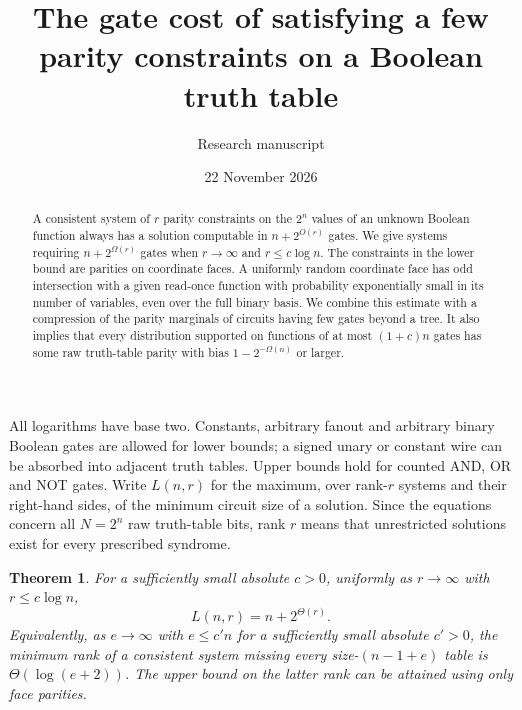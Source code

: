 \documentclass[11pt]{article}
\title{The gate cost of satisfying a few parity constraints on a Boolean truth table}
\author{Research manuscript}\date{22 November 2026}
\newtheorem{theorem}{Theorem}
\begin{document}
\maketitle
\begin{abstract}
A consistent system of $r$ parity constraints on the $2^n$ values of an unknown Boolean function always has a solution computable in $n+2^{O(r)}$ gates. We give systems requiring $n+2^{\Omega(r)}$ gates when $r\to\infty$ and $r\le c\log n$. The constraints in the lower bound are parities on coordinate faces. A uniformly random coordinate face has odd intersection with a given read-once function with probability exponentially small in its number of variables, even over the full binary basis. We combine this estimate with a compression of the parity marginals of circuits having few gates beyond a tree. It also implies that every distribution supported on functions of at most $(1+c)n$ gates has some raw truth-table parity with bias $1-2^{-\Omega(n)}$ or larger.
\end{abstract}
All logarithms have base two. Constants, arbitrary fanout and arbitrary binary Boolean gates are allowed for lower bounds; a signed unary or constant wire can be absorbed into adjacent truth tables. Upper bounds hold for counted AND, OR and NOT gates. Write $L(n,r)$ for the maximum, over rank-$r$ systems and their right-hand sides, of the minimum circuit size of a solution. Since the equations concern all $N=2^n$ raw truth-table bits, rank $r$ means that unrestricted solutions exist for every prescribed syndrome.

\begin{theorem}\label{main}
For a sufficiently small absolute $c>0$, uniformly as $r\to\infty$ with $r\le c\log n$,
\[
                       L(n,r)=n+2^{\Theta(r)}.
\]
Equivalently, as $e\to\infty$ with $e\le c'n$ for a sufficiently small absolute $c'>0$, the minimum rank of a consistent system missing every size-$(n-1+e)$ table is $\Theta(\log(e+2))$. The upper bound on the latter rank can be attained using only face parities.
\end{theorem}
\end{document}
